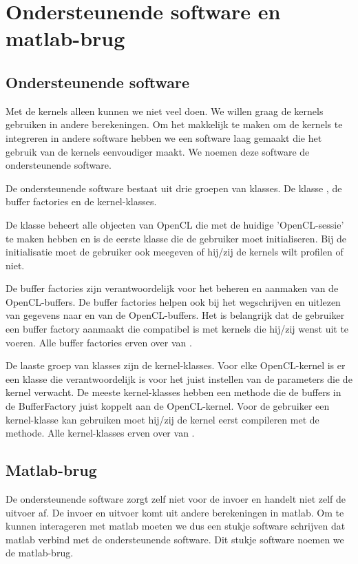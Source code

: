 \chapter{Ondersteunende software en matlab-brug}
\label{h:ondersteunende}
\section{Ondersteunende software}
Met de kernels alleen kunnen we niet veel doen. We willen graag de kernels gebruiken in andere berekeningen. Om het makkelijk te maken om de kernels te integreren in andere software hebben we een software laag gemaakt die het gebruik van de kernels eenvoudiger maakt. We noemen deze software de ondersteunende software.

De ondersteunende software bestaat uit drie groepen van klasses. De klasse , de buffer factories en de kernel-klasses.

De klasse  beheert alle objecten van OpenCL die met de huidige 'OpenCL-sessie' te maken hebben en is de eerste klasse die de gebruiker moet initialiseren. Bij de initialisatie moet de gebruiker ook meegeven of hij/zij de kernels wilt profilen of niet.

De buffer factories zijn verantwoordelijk voor het beheren en aanmaken van de OpenCL-buffers. De buffer factories helpen ook bij het wegschrijven en uitlezen van gegevens naar en van de OpenCL-buffers. Het is belangrijk dat de gebruiker een buffer factory aanmaakt die compatibel is met kernels die hij/zij wenst uit te voeren. Alle buffer factories erven over van .

De laaste groep van klasses zijn de kernel-klasses. Voor elke OpenCL-kernel is er een klasse die verantwoordelijk is voor het juist instellen van de parameters die de kernel verwacht. De meeste kernel-klasses hebben een methode  die de buffers in de BufferFactory juist koppelt aan de OpenCL-kernel. Voor de gebruiker een kernel-klasse kan gebruiken moet hij/zij de kernel eerst compileren met de  methode. Alle kernel-klasses erven over van .


\section{Matlab-brug}
De ondersteunende software zorgt zelf niet voor de invoer en handelt niet zelf de uitvoer af. De invoer en uitvoer komt uit andere berekeningen in matlab. Om te kunnen interageren met matlab moeten we dus een stukje software schrijven dat matlab verbind met de ondersteunende software. Dit stukje software noemen we de matlab-brug.